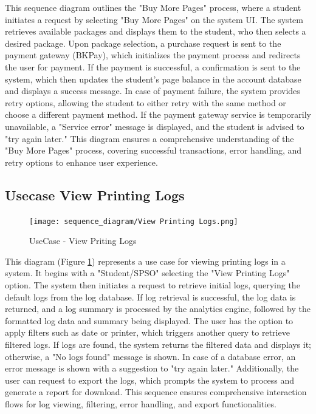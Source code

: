 \documentclass[a4paper]{report}
\begin{document}
This sequence diagram outlines the "Buy More Pages" process, where a student initiates a request by selecting "Buy More Pages" on the system UI. The system retrieves available packages and displays them to the student, who then selects a desired package. Upon package selection, a purchase request is sent to the payment gateway (BKPay), which initializes the payment process and redirects the user for payment. If the payment is successful, a confirmation is sent to the system, which then updates the student's page balance in the account database and displays a success message. In case of payment failure, the system provides retry options, allowing the student to either retry with the same method or choose a different payment method. If the payment gateway service is temporarily unavailable, a "Service error" message is displayed, and the student is advised to "try again later." This diagram ensures a comprehensive understanding of the "Buy More Pages" process, covering successful transactions, error handling, and retry options to enhance user experience.

\subsection{Usecase View Printing Logs}

\begin{figure}[H]
    \centering
    \texttt{[image: sequence\_diagram/View Printing Logs.png]}
    \caption{UseCase - View Priting Logs}
    \label{fig:view_printing_logs}
    
\end{figure}

This diagram (Figure \ref{fig:view_printing_logs}) represents a use case for viewing printing logs in a system. It begins with a "Student/SPSO" selecting the "View Printing Logs" option. The system then initiates a request to retrieve initial logs, querying the default logs from the log database. If log retrieval is successful, the log data is returned, and a log summary is processed by the analytics engine, followed by the formatted log data and summary being displayed. The user has the option to apply filters such as date or printer, which triggers another query to retrieve filtered logs. If logs are found, the system returns the filtered data and displays it; otherwise, a "No logs found" message is shown. In case of a database error, an error message is shown with a suggestion to "try again later." Additionally, the user can request to export the logs, which prompts the system to process and generate a report for download. This sequence ensures comprehensive interaction flows for log viewing, filtering, error handling, and export functionalities.
\end{document}
